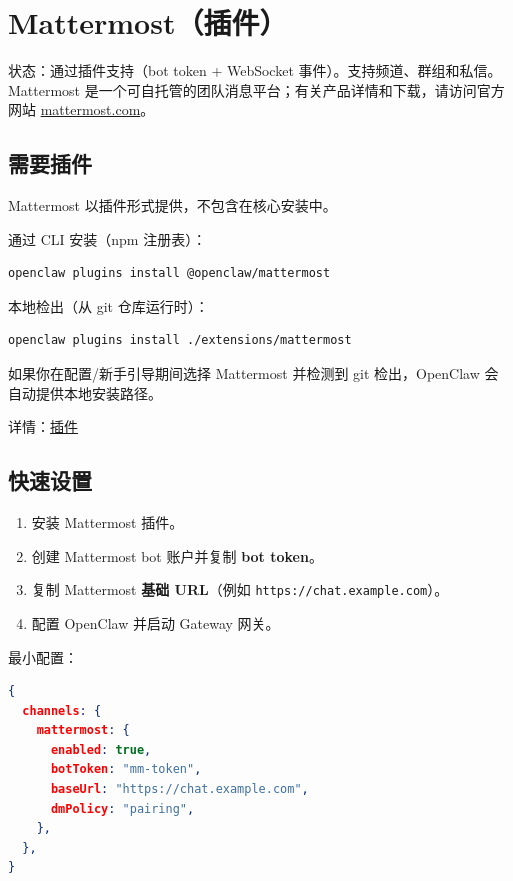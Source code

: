 \clearpage

\section{Mattermost（插件）}


状态：通过插件支持（bot token + WebSocket 事件）。支持频道、群组和私信。
Mattermost 是一个可自托管的团队消息平台；有关产品详情和下载，请访问官方网站
\href{https://mattermost.com}{mattermost.com}。

\subsection{需要插件}


Mattermost 以插件形式提供，不包含在核心安装中。

通过 CLI 安装（npm 注册表）：

\begin{lstlisting}[language=bash]
openclaw plugins install @openclaw/mattermost
\end{lstlisting}


本地检出（从 git 仓库运行时）：

\begin{lstlisting}[language=bash]
openclaw plugins install ./extensions/mattermost
\end{lstlisting}


如果你在配置/新手引导期间选择 Mattermost 并检测到 git 检出，OpenClaw 会自动提供本地安装路径。

详情：\href{/tools/plugin}{插件}

\subsection{快速设置}


\begin{enumerate}
  \item 安装 Mattermost 插件。
  \item 创建 Mattermost bot 账户并复制 \textbf{bot token}。
  \item 复制 Mattermost \textbf{基础 URL}（例如 \texttt{https://chat.example.com}）。
  \item 配置 OpenClaw 并启动 Gateway 网关。
\end{enumerate}


最小配置：

\begin{lstlisting}[language=json]
{
  channels: {
    mattermost: {
      enabled: true,
      botToken: "mm-token",
      baseUrl: "https://chat.example.com",
      dmPolicy: "pairing",
    },
  },
}
\end{lstlisting}


